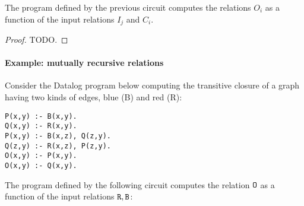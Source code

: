 \begin{enumerate}
\end{enumerate}

\begin{theorem}
The program defined by the previous circuit computes
the relations $O_i$ as a function of the input relations $I_j$ and $C_i$.
\end{theorem}
\begin{proof}
TODO.
\end{proof}

\paragraph{Example: mutually recursive relations}

Consider the Datalog program below computing the transitive closure of a graph
having two kinds of edges, blue (B) and red (R):

\begin{lstlisting}[language=ddlog]
P(x,y) :- B(x,y).
Q(x,y) :- R(x,y).
P(x,y) :- B(x,z), Q(z,y).
Q(z,y) :- R(x,z), P(z,y).
O(x,y) :- P(x,y).
O(x,y) :- Q(x,y).
\end{lstlisting}

The program defined by the following circuit computes
the relation $\mbox{\texttt{O}}$ as a function of the input relations $\mbox{\texttt{R}}, \mbox{\texttt{B}}$:


